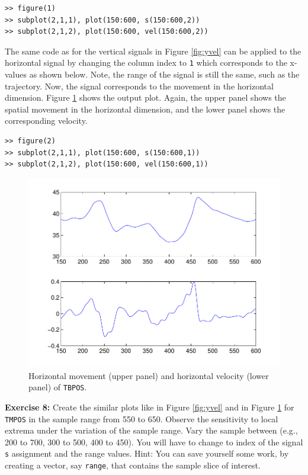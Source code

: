 \documentclass[a4paper, 12pt]{article}
\begin{document}
\begin{verbatim}
>> figure(1)
>> subplot(2,1,1), plot(150:600, s(150:600,2))
>> subplot(2,1,2), plot(150:600, vel(150:600,2))
\end{verbatim}


The same code as for the vertical signals in Figure \ref{fig:yvel} can be applied to the horizontal signal by changing the column index to \texttt{1} which corresponds to the x-values as shown below. Note, the range of the signal is still the same, such as the trajectory. Now, the signal corresponds to the movement in the horizontal dimension. Figure \ref{fig:xvel} shows the output plot. Again, the upper panel shows the spatial movement in the horizontal dimension, and the lower panel shows the corresponding velocity.

\begin{verbatim}
>> figure(2)
>> subplot(2,1,1), plot(150:600, s(150:600,1))
>> subplot(2,1,2), plot(150:600, vel(150:600,1))
\end{verbatim}

\setlength\intextsep{-10pt}
\begin{figure}
\includegraphics[scale=0.45]{xsign.pdf}%
\caption{Horizontal movement (upper panel) and horizontal velocity (lower panel) of \texttt{TBPOS}.}\label{fig:xvel}
\end{figure}

\noindent\textbf{Exercise 8:} Create the similar plots like in Figure \ref{fig:yvel} and in Figure \ref{fig:xvel} for \texttt{TMPOS} in the sample range from 550 to 650. Observe the sensitivity to local extrema under the variation of the sample range. Vary the sample between (e.g., 200 to 700, 300 to 500, 400 to 450). You will have to change to index of the signal \texttt{s} assignment and the range values. Hint: You can save yourself some work, by creating a vector, say \texttt{range}, that contains the sample slice of interest.\par\smallskip
\end{document}
